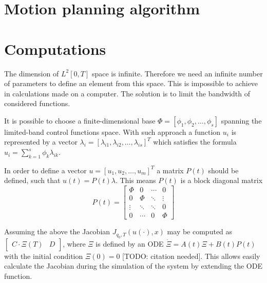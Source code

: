\section{Motion planning algorithm}

\section{Computations}
The dimension of $L^2[0,T]$ space is infinite. Therefore we need an infinite number of parameters to define an element from this space. This is impossible to achieve in calculations made on a computer. The solution is to limit the bandwidth of considered functions. 

It is possible to choose a finite-dimensional base $\Phi = [ \phi_1, \phi_2, \dots, \phi_s ]$ spanning the limited-band control functions space. 
With such approach a function $u_i$ is represented by a vector 
$\lambda_i = [\lambda_{i1}, \lambda_{i2}, \dots, \lambda_{is}]^T$ 
which satisfies the formula $u_i = \sum_{k=1}^s \phi_k \lambda_{ik}$.

In order to define a vector $u=[u_1, u_2, \dots, u_m]^T$ a matrix $P(t)$ should be defined, such that $u(t)=P(t)\lambda$. This means $P(t)$ is a block diagonal matrix 
\begin{equation}
P(t)=\begin{bmatrix}
\Phi & 0 & \cdots & 0\\
0 & \Phi & \ddots & \vdots\\
\vdots & \ddots & \ddots & 0 \\
0 &  \cdots & 0 & \Phi
\end{bmatrix}
\end{equation}

Assuming the above the Jacobian $J_{q_0, T}(u(\cdot), x)$ may be computed as $\begin{bmatrix}
C\cdot\Xi(T)& D
\end{bmatrix}$, where $\Xi$ is defined by an ODE $\dot \Xi = A(t)\Xi +B(t)P(t)$ with the initial condition $\Xi(0)=0$ [TODO: citation needed]. This allows easily calculate the Jacobian during the simulation of the system by extending the ODE function.
